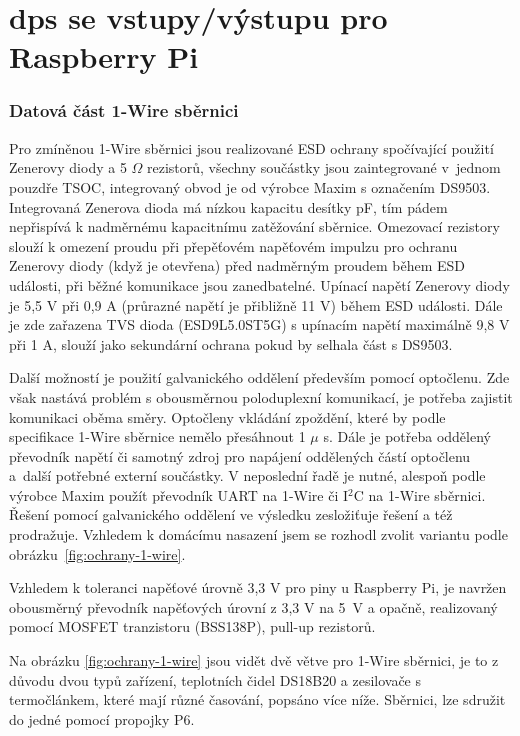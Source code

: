 \section{\acrshort{dps} se vstupy/výstupu pro Raspberry Pi}
\label{sec:dps-se-vstupy-vystupy-pro-raspberry-pi}

\subsubsection{Datová část 1-Wire sběrnici}
\label{sec:datova-cast-1-wire-sbernice}
Pro zmíněnou 1-Wire sběrnici jsou realizované ESD ochrany spočívající použití Zenerovy diody a  5 $\Omega$ rezistorů, všechny součástky jsou zaintegrované v~jednom pouzdře TSOC, integrovaný obvod je od výrobce Maxim s označením DS9503. Integrovaná Zenerova dioda má nízkou kapacitu desítky pF, tím pádem nepřispívá k nadměrnému kapacitnímu zatěžování sběrnice. Omezovací rezistory slouží k omezení proudu při přepěťovém napěťovém impulzu pro ochranu Zenerovy diody (když je otevřena) před nadměrným proudem během ESD události, při běžné komunikace jsou zanedbatelné. Upínací napětí Zenerovy diody je 5,5 V při 0,9 A (průrazné napětí je přibližně 11 V) během ESD události. Dále je zde zařazena TVS dioda (ESD9L5.0ST5G) s upínacím napětí maximálně 9,8 V při 1 A, slouží jako sekundární ochrana pokud by selhala část s DS9503. 

Další možností je použití galvanického oddělení především pomocí optočlenu. Zde však nastává problém s obousměrnou poloduplexní komunikací, je potřeba zajistit komunikaci oběma směry. Optočleny vkládání zpoždění, které by podle specifikace 1-Wire sběrnice nemělo přesáhnout 1 $\mu$ s. Dále je potřeba oddělený převodník napětí či samotný zdroj pro napájení oddělených částí optočlenu a~další potřebné externí součástky. V neposlední řadě je nutné, alespoň podle výrobce Maxim použít převodník UART na 1-Wire či I$^2$C na 1-Wire sběrnici. Řešení pomocí galvanického oddělení ve výsledku zesložiťuje řešení a též prodražuje. Vzhledem k domácímu nasazení jsem se rozhodl zvolit variantu podle obrázku~\ref{fig:ochrany-1-wire}.

Vzhledem k toleranci napěťové úrovně 3,3 V pro piny u Raspberry Pi, je navržen obousměrný převodník napěťových úrovní z 3,3 V na 5~V a opačně, realizovaný pomocí MOSFET tranzistoru (BSS138P), pull-up rezistorů.

Na obrázku \ref{fig:ochrany-1-wire} jsou vidět dvě větve pro 1-Wire sběrnici, je to z důvodu dvou typů zařízení, teplotních čidel DS18B20 a  zesilovače s termočlánkem, které mají různé časování, popsáno více níže. Sběrnici, lze sdružit do jedné pomocí propojky P6.

